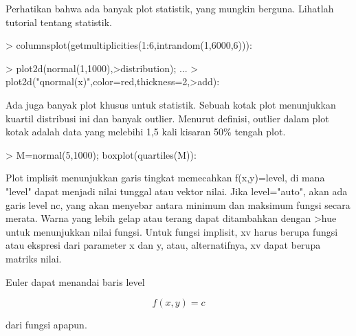 \documentclass{report}
\begin{document}
\begin{eulernotebook}
\begin{eulercomment}
\begin{eulercomment}
\begin{eulercomment}
\begin{eulercomment}
\begin{eulerprompt}
\end{eulerprompt}
\begin{eulercomment}
Perhatikan bahwa ada banyak plot statistik, yang mungkin berguna.
Lihatlah tutorial tentang statistik.
\end{eulercomment}
\begin{eulerprompt}
> columnsplot(getmultiplicities(1:6,intrandom(1,6000,6))):
\end{eulerprompt}
\begin{eulerprompt}
> plot2d(normal(1,1000),>distribution); ...
>   plot2d("qnormal(x)",color=red,thickness=2,>add):
\end{eulerprompt}
\begin{eulercomment}
Ada juga banyak plot khusus untuk statistik. Sebuah kotak plot
menunjukkan kuartil distribusi ini dan banyak outlier. Menurut
definisi, outlier dalam plot kotak adalah data yang melebihi 1,5 kali
kisaran 50\% tengah plot.
\end{eulercomment}
\begin{eulerprompt}
> M=normal(5,1000); boxplot(quartiles(M)):
\end{eulerprompt}
\begin{eulercomment}
Plot implisit menunjukkan garis tingkat memecahkan f(x,y)=level, di
mana "level" dapat menjadi nilai tunggal atau vektor nilai. Jika
level="auto", akan ada garis level nc, yang akan menyebar antara
minimum dan maksimum fungsi secara merata. Warna yang lebih gelap atau
terang dapat ditambahkan dengan \textgreater{}hue untuk menunjukkan nilai fungsi.
Untuk fungsi implisit, xv harus berupa fungsi atau ekspresi dari
parameter x dan y, atau, alternatifnya, xv dapat berupa matriks nilai.

Euler dapat menandai baris level

\end{eulercomment}
\begin{eulerformula}
\[
f(x,y) = c
\]
\end{eulerformula}
\begin{eulercomment}
dari fungsi apapun.


\end{eulercomment}
\end{eulercomment}
\end{eulercomment}
\end{eulercomment}
\end{eulercomment}
\end{eulernotebook}
\end{document}
